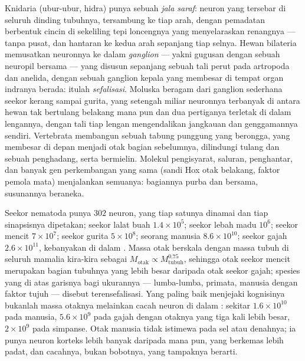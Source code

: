 \begin{definition}\label{def:b3:nervous-systems:comparative}
Knidaria (ubur-ubur, hidra) punya sebuah \emph{jala saraf}: neuron yang
tersebar di seluruh dinding tubuhnya, tersambung ke tiap arah, dengan
pemadatan berbentuk cincin di sekeliling tepi loncengnya yang menyelaraskan
renangnya --- tanpa pusat, dan hantaran ke kedua arah sepanjang tiap
selnya. Hewan bilateria memusatkan neuronnya ke dalam \emph{ganglion} ---
yakni gugusan dengan sebuah neuropil bersama --- yang disusun sepanjang sebuah
tali perut pada artropoda dan anelida, dengan sebuah ganglion kepala yang
membesar di tempat organ indranya berada: itulah \emph{sefalisasi}. Moluska
beragam dari ganglion sederhana seekor kerang sampai gurita, yang setengah
miliar neuronnya terbanyak di antara hewan tak bertulang belakang mana pun dan
dua pertiganya terletak di dalam lengannya, dengan tali tiap lengan
mengendalikan jangkauan dan genggamannya sendiri. Vertebrata membangun sebuah
tabung punggung yang berongga, yang membesar di depan menjadi otak bagian
sebelumnya, dilindungi tulang dan sebuah penghadang, serta bermielin. Molekul
pengisyarat, saluran, penghantar, dan banyak gen perkembangan yang sama (sandi
Hox otak belakang, faktor pemola mata) menjalankan semuanya: bagiannya purba
dan bersama, susunannya beraneka.
\end{definition}

\begin{example}\label{ex:b3:nervous-systems:counts}
Seekor nematoda punya $302$ neuron, yang tiap satunya dinamai dan tiap
sinapsisnya dipetakan; seekor lalat buah $1.4\times 10^{5}$; seekor lebah madu
$10^{6}$; seekor mencit $7\times 10^{7}$; seekor gurita $5\times 10^{8}$;
seorang manusia $8.6\times
10^{10}$; seekor gajah $2.6\times 10^{11}$, kebanyakan di dalam . Massa otak berskala dengan massa tubuh di
seluruh mamalia kira-kira sebagai
$M_{\text{otak}} \propto M_{\text{tubuh}}^{0.75}$, sehingga otak seekor mencit
merupakan bagian tubuhnya
yang lebih besar daripada otak seekor gajah; spesies yang di atas garisnya bagi
ukurannya --- lumba-lumba, primata, manusia dengan faktor tujuh --- disebut
terensefalisasi. Yang paling baik menjejaki kognisinya bukanlah massa otaknya
melainkan cacah neuron di dalam : sekitar
$1.6\times 10^{10}$ pada manusia, $5.6\times 10^{9}$ pada gajah dengan
otaknya yang tiga kali lebih besar, $2\times 10^{9}$ pada simpanse. Otak
manusia tidak istimewa pada sel atau denahnya; ia punya neuron korteks lebih
banyak daripada mana pun, yang berkemas lebih padat, dan cacahnya, bukan
bobotnya, yang tampaknya berarti.
\end{example}

